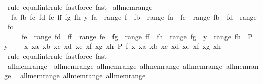 \begin{isabellebody}
\ {\isacharparenleft}{\kern0pt}rule\ equal{\isacharunderscore}{\kern0pt}intr{\isacharunderscore}{\kern0pt}rule{\isacharparenright}{\kern0pt}\ {\isacharparenleft}{\kern0pt}fastforce{\isacharcomma}{\kern0pt}\ fast{\isacharparenright}{\kern0pt}%
\endisatagproof
{\isafoldproof}%
%
\isadelimproof
\isanewline
%
\endisadelimproof
\isanewline
{}\isamarkupfalse%
\ all{\isacharunderscore}{\kern0pt}mem{\isacharunderscore}{\kern0pt}range{}{\isacharcolon}{\kern0pt}\isanewline
\ \ {\isachardoublequoteopen}{\isacharparenleft}{\kern0pt}{\isasymAnd}fa\ fb\ fc\ fd\ fe\ ff\ fg\ fh\ y{\isachardot}{\kern0pt}\ fa\ {\isasymin}\ range\ f\ {\isasymLongrightarrow}\ fb\ {\isasymin}\ range\ fa\ {\isasymLongrightarrow}\ fc\ {\isasymin}\ range\ fb\ {\isasymLongrightarrow}\ fd\ {\isasymin}\ range\ fc\ {\isasymLongrightarrow}\isanewline
\ \ \ \ \ fe\ {\isasymin}\ range\ fd\ {\isasymLongrightarrow}\ ff\ {\isasymin}\ range\ fe\ {\isasymLongrightarrow}\ fg\ {\isasymin}\ range\ ff\ {\isasymLongrightarrow}\ fh\ {\isasymin}\ range\ fg\ {\isasymLongrightarrow}\ y\ {\isasymin}\ range\ fh\ {\isasymLongrightarrow}\ P\ y{\isacharparenright}{\kern0pt}\ {\isasymequiv}\isanewline
\ \ \ {\isacharparenleft}{\kern0pt}{\isasymAnd}x\ xa\ xb\ xc\ xd\ xe\ xf\ xg\ xh{\isachardot}{\kern0pt}\ P\ {\isacharparenleft}{\kern0pt}f\ x\ xa\ xb\ xc\ xd\ xe\ xf\ xg\ xh{\isacharparenright}{\kern0pt}{\isacharparenright}{\kern0pt}{\isachardoublequoteclose}\isanewline
%
\isadelimproof
\ \ %
\endisadelimproof
%
\isatagproof
{}\isamarkupfalse%
\ {\isacharparenleft}{\kern0pt}rule\ equal{\isacharunderscore}{\kern0pt}intr{\isacharunderscore}{\kern0pt}rule{\isacharparenright}{\kern0pt}\ {\isacharparenleft}{\kern0pt}fastforce{\isacharcomma}{\kern0pt}\ fast{\isacharparenright}{\kern0pt}%
\endisatagproof
{\isafoldproof}%
%
\isadelimproof
\isanewline
%
\endisadelimproof
\isanewline
{}\isamarkupfalse%
\ all{\isacharunderscore}{\kern0pt}mem{\isacharunderscore}{\kern0pt}range\ {\isacharequal}{\kern0pt}\ all{\isacharunderscore}{\kern0pt}mem{\isacharunderscore}{\kern0pt}range{}\ all{\isacharunderscore}{\kern0pt}mem{\isacharunderscore}{\kern0pt}range{}\ all{\isacharunderscore}{\kern0pt}mem{\isacharunderscore}{\kern0pt}range{}\ all{\isacharunderscore}{\kern0pt}mem{\isacharunderscore}{\kern0pt}range{}\ all{\isacharunderscore}{\kern0pt}mem{\isacharunderscore}{\kern0pt}range{}\isanewline
\ \ all{\isacharunderscore}{\kern0pt}mem{\isacharunderscore}{\kern0pt}range{}\ all{\isacharunderscore}{\kern0pt}mem{\isacharunderscore}{\kern0pt}range{}\ all{\isacharunderscore}{\kern0pt}mem{\isacharunderscore}{\kern0pt}range{}\isanewline

\end{isabellebody}

